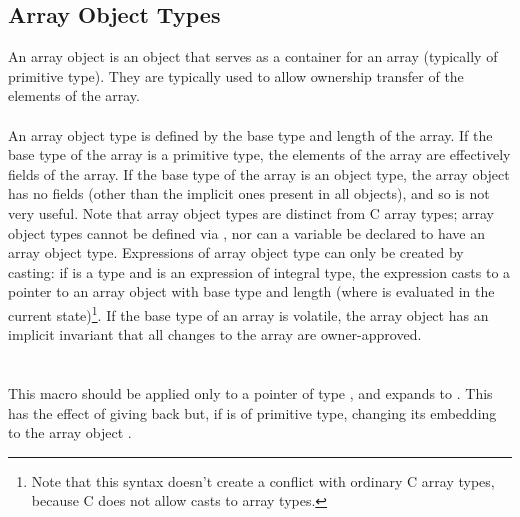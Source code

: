 \documentclass[preprint,nocopyrightspace]{sigplanconf}
\begin{document}
{{{\subsection{Array Object Types}
An array object is an object that serves as a container for an array
(typically of primitive type). They are typically used to allow
ownership transfer of the elements of the array.
\\\\
An array object type is defined by the base type and length of the
array. If the base type of the array is a primitive type, the elements
of the array are effectively fields of the array. If the base type of
the array is an object type, the array object has no fields (other than
the implicit ones
present in all objects), and so is not very useful. Note that
array object types are distinct from C array
types; array object types cannot be defined via , nor can
a variable be declared to have an array object type. Expressions of
array object type can only be created by casting: if  is a type
and  is an expression of integral type, the
expression  casts  to a pointer to an array
object with base type  and length  (where  is
evaluated in the current state)\footnote{Note that this syntax doesn't
create a conflict with ordinary C array types, because C does not
allow casts to array types.}.
If the base type of an array is volatile, the array object has
an implicit invariant that all changes to the array are
owner-approved.
\\\\
\\
This macro should be applied only to a pointer  of type , and
expands to . This has the effect of giving
back  but, if  is of primitive type, changing its
embedding to the array object . 

}}}
\end{document}
